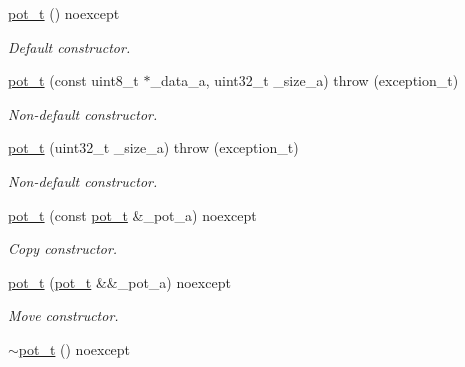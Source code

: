 \begin{DoxyCompactItemize}
\item 
\hyperlink{class_n_h_1_1_protocols_1_1_raw_1_1pot__t_af086f3f10e88f3f906a0fd5c9901d4f1}{pot\+\_\+t} () noexcept
\begin{DoxyCompactList}\small\item\em Default constructor. \end{DoxyCompactList}\item 
\hyperlink{class_n_h_1_1_protocols_1_1_raw_1_1pot__t_a4c2c3964a61735786ec9e31b10524f7c}{pot\+\_\+t} (const uint8\+\_\+t $\ast$\+\_\+data\+\_\+a, uint32\+\_\+t \+\_\+size\+\_\+a)  throw (exception\+\_\+t)
\begin{DoxyCompactList}\small\item\em Non-\/default constructor. \end{DoxyCompactList}\item 
\hyperlink{class_n_h_1_1_protocols_1_1_raw_1_1pot__t_ae40dc98cefa4754adcd154928f5d6fe3}{pot\+\_\+t} (uint32\+\_\+t \+\_\+size\+\_\+a)  throw (exception\+\_\+t)
\begin{DoxyCompactList}\small\item\em Non-\/default constructor. \end{DoxyCompactList}\item 
\hypertarget{class_n_h_1_1_protocols_1_1_raw_1_1pot__t_a378d13cc9b400920d62cbc0edcbd08ef}{\hyperlink{class_n_h_1_1_protocols_1_1_raw_1_1pot__t_a378d13cc9b400920d62cbc0edcbd08ef}{pot\+\_\+t} (const \hyperlink{class_n_h_1_1_protocols_1_1_raw_1_1pot__t}{pot\+\_\+t} \&\+\_\+pot\+\_\+a) noexcept}\label{class_n_h_1_1_protocols_1_1_raw_1_1pot__t_a378d13cc9b400920d62cbc0edcbd08ef}

\begin{DoxyCompactList}\small\item\em Copy constructor. \end{DoxyCompactList}\item 
\hypertarget{class_n_h_1_1_protocols_1_1_raw_1_1pot__t_aadc3a3bd8e3d337b9c9cbde868cfb047}{\hyperlink{class_n_h_1_1_protocols_1_1_raw_1_1pot__t_aadc3a3bd8e3d337b9c9cbde868cfb047}{pot\+\_\+t} (\hyperlink{class_n_h_1_1_protocols_1_1_raw_1_1pot__t}{pot\+\_\+t} \&\&\+\_\+pot\+\_\+a) noexcept}\label{class_n_h_1_1_protocols_1_1_raw_1_1pot__t_aadc3a3bd8e3d337b9c9cbde868cfb047}

\begin{DoxyCompactList}\small\item\em Move constructor. \end{DoxyCompactList}\item 
\hypertarget{class_n_h_1_1_protocols_1_1_raw_1_1pot__t_a6dff7ad396d312de62f1a4568b4ec51c}{\hyperlink{class_n_h_1_1_protocols_1_1_raw_1_1pot__t_a6dff7ad396d312de62f1a4568b4ec51c}{$\sim$pot\+\_\+t} () noexcept}\label{class_n_h_1_1_protocols_1_1_raw_1_1pot__t_a6dff7ad396d312de62f1a4568b4ec51c}


\end{DoxyCompactItemize}
